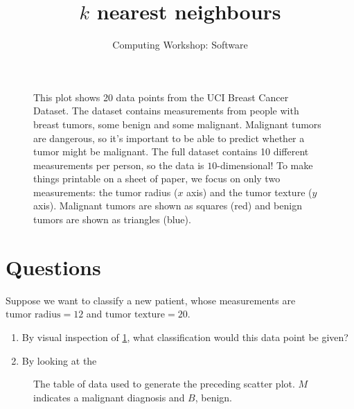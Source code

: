 \documentclass[11pt]{article}
\title{$k$ nearest neighbours}
\author{Computing Workshop: Software}
\begin{document}
\maketitle

\begin{figure}[h]
  \centering
  \caption{%
    This plot shows 20 data points from the UCI Breast Cancer Dataset.
    The dataset contains measurements from people with breast tumors, some
    benign and some malignant. Malignant tumors are dangerous, so it's important
    to be able to predict whether a tumor might be malignant.
    The full dataset contains 10 different measurements per person, so the data
    is $10$-dimensional! To make things printable on a sheet of paper, we focus
    on only two measurements: the tumor radius ($x$ axis) and the tumor texture
    ($y$ axis).%
    Malignant tumors are shown as squares (red) and benign tumors are shown as
    triangles (blue).
  }
  \label{fig:chart}
\end{figure}

\section*{Questions}

Suppose we want to classify a new patient, whose measurements are
$\text{tumor radius} = 12$ and $\text{tumor texture} = 20$.

\begin{enumerate}
\item
  By visual inspection of \ref{fig:chart}, what classification would this data
  point be given?
\item
  By looking at the 
\end{enumerate}

\begin{figure}[h]
  \centering
  \caption{%
    The table of data used to generate the preceding scatter plot.
    $M$ indicates a malignant diagnosis and $B$, benign.%
  }
\end{figure}
\end{document}
